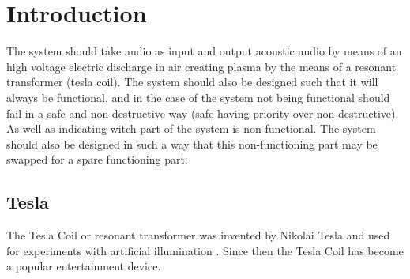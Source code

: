 \section{Introduction}
\label{intro}
The system should take audio as input and output acoustic audio by means of an high voltage electric discharge in air creating plasma by the means of a resonant transformer (tesla coil). The system should also be designed such that it will always be functional, and in the case of the system not being functional should fail in a safe and non-destructive way (safe having priority over non-destructive). As well as indicating witch part of the system is non-functional. The system should also be designed in such a way that this non-functioning part may be swapped for a spare functioning part.

\subsection{Tesla}
\label{tesla}
The Tesla Coil or resonant transformer was invented by Nikolai Tesla and used for experiments with artificial illumination \citep{5570149}. Since then the Tesla Coil has become a popular entertainment device.
